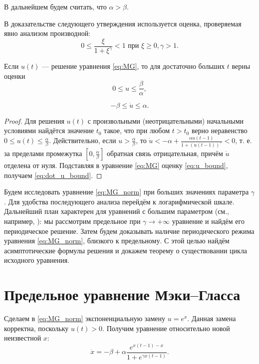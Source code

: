 В дальнейшем будем считать, что $\alpha > \beta$.

В доказательстве следующего утверждения используется оценка, проверяемая явно анализом производной:
%
\[
0 \leq \dfrac{\xi}{1 + \xi^{\gamma}} < 1 \text{ при } \xi \geq 0, \gamma > 1.
\]


\begin{proposition}
	\label{prop:boundness}
	Если $u(t)$ --- решение уравнения \eqref{eq:MG}, то для достаточно больших $t$ верны оценки
	\begin{equation}
		\label{eq:u_bound}
		0 \leq u \leq \frac{\beta}{\alpha},
	\end{equation}
	
	\begin{equation}
		\label{eq:dot_u_bound}
		-\beta \leq \dot{u} \leq \alpha.
	\end{equation}
\end{proposition}
\begin{proof}
	Для решения $u(t)$ с произвольными (неотрицательными) начальными условиями найдётся значение $t_0$ такое, что при любом $t > t_0$ верно неравенство $0 \leq u(t) \leq \frac{\alpha}{\beta}$. Действительно, если $u > \frac{\alpha}{\beta}$, то $\dot{u} < -\alpha + \frac{\alpha u(t - 1)}{1 + (u(t - 1))^{\gamma}} < 0$, т. е. за пределами промежутка $[0, \frac{\alpha}{\beta}]$ обратная связь отрицательная, причём $\dot{u}$ отделена от нуля. Подставляя в уравнение \eqref{eq:MG} оценку \eqref{eq:u_bound}, получаем \eqref{eq:dot_u_bound}.
\end{proof}

Будем исследовать уравнение \eqref{eq:MG_norm} при больших значениях параметра $\gamma$. Для удобства последующего анализа перейдём к логарифмической шкале. Дальнейший план характерен для уравнений с большим параметром (см., например, \cite{Kolesov2010}): мы рассмотрим предельное при $\gamma\to+\infty$ уравнение и найдём его периодическое решение. Затем будем доказывать наличие периодического режима уравнения \eqref{eq:MG_norm}, близкого к предельному. С этой целью найдём асимптотические формулы решения и докажем теорему о существовании цикла исходного уравнения.

\section{Предельное уравнение Мэки--Гласса}\label{sec:ch1/sec1}

Сделаем в \eqref{eq:MG_norm} экспоненциальную замену $u=e^x$. Данная замена корректна, поскольку $u(t) > 0$. Получим уравнение относительно новой неизвестной $x$:
\begin{equation}
	\label{eq:MG_x}
	\dot{x}=-\beta+\alpha\frac{e^{x(t-1)-x}}{1+e^{\gamma x(t-1)}}.
\end{equation}

